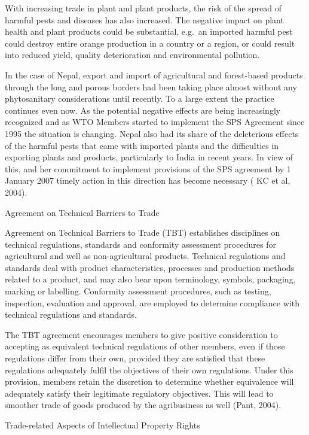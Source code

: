 \documentclass[
]{book}
\begin{document}
With increasing trade in plant and plant products, the risk of the spread of harmful pests and diseases has also increased. The negative impact on plant health and plant products could be substantial, e.g.~an imported harmful pest could destroy entire orange production in a country or a region, or could result into reduced yield, quality deterioration and environmental pollution.

In the case of Nepal, export and import of agricultural and forest-based products through the long and porous borders had been taking place almost without any phytosanitary considerations until recently. To a large extent the practice continues even now. As the potential negative effects are being increasingly recognized and as WTO Members started to implement the SPS Agreement since 1995 the situation is changing. Nepal also had its share of the deleterious effects of the harmful pests that came with imported plants and the difficulties in exporting plants and products, particularly to India in recent years. In view of this, and her commitment to implement provisions of the SPS agreement by 1 January 2007 timely action in this direction has become necessary ( KC et al, 2004).

Agreement on Technical Barriers to Trade

Agreement on Technical Barriers to Trade (TBT) establishes disciplines on technical regulations, standards and conformity assessment procedures for agricultural and well as non-agricultural products. Technical regulations and standards deal with product characteristics, processes and production methods related to a product, and may also bear upon terminology, symbols, packaging, marking or labelling. Conformity assessment procedures, such as testing, inspection, evaluation and approval, are employed to determine compliance with technical regulations and standards.

The TBT agreement encourages members to give positive consideration to accepting as equivalent technical regulations of other members, even if those regulations differ from their own, provided they are satisfied that these regulations adequately fulfil the objectives of their own regulations. Under this provision, members retain the discretion to determine whether equivalence will adequately satisfy their legitimate regulatory objectives. This will lead to smoother trade of goods produced by the agribusiness as well (Pant, 2004).

Trade-related Aspects of Intellectual Property Rights
\end{document}
